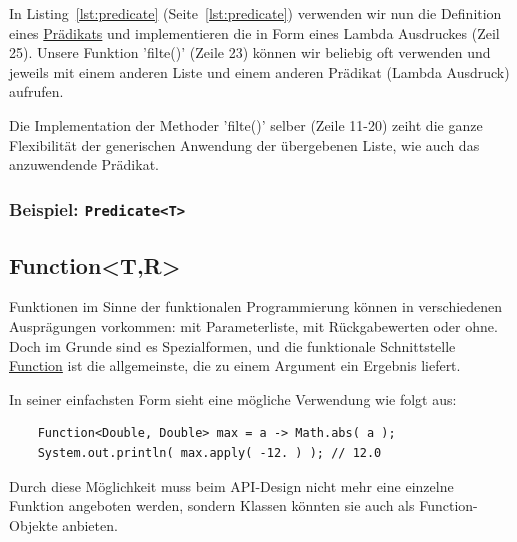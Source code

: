 In Listing~\ref{lst:predicate} (Seite~\ref{lst:predicate}) verwenden wir nun
die Definition eines
\href{https://docs.oracle.com/en/java/javase/11/docs/api/java.base/java/util/function/Predicate.html}
{Prädikats} und implementieren die in Form eines Lambda Ausdruckes (Zeil 25). Unsere Funktion
'filte()' (Zeile 23) können wir beliebig oft verwenden und jeweils mit einem anderen Liste und einem
anderen Prädikat (Lambda Ausdruck) aufrufen.

Die Implementation der Methoder 'filte()' selber (Zeile 11-20) zeiht die ganze Flexibilität
der generischen Anwendung der übergebenen Liste, wie auch das anzuwendende Prädikat.


\begin{frame}[fragile]
    \frametitle<presentation>{Beispiel: \texttt{Predicate<T>}}

\end{frame}

\mode*
{}


\subsection{Function<T,R>}
\label{subsec:function}

Funktionen im Sinne der funktionalen Programmierung können in verschiedenen
Ausprägungen vorkommen: mit Parameterliste, mit Rückgabewerten oder ohne.
Doch im Grunde sind es Spezialformen, und die funktionale Schnittstelle
\href{https://docs.oracle.com/en/java/javase/11/docs/api/java.base/java/util/function/Function.html}
{Function} ist die allgemeinste, die zu einem Argument
ein Ergebnis liefert.

In seiner einfachsten Form sieht eine mögliche Verwendung wie folgt aus:

\begin{verbatim}
    Function<Double, Double> max = a -> Math.abs( a );
    System.out.println( max.apply( -12. ) ); // 12.0
\end{verbatim}

Durch diese Möglichkeit muss beim API-Design nicht mehr eine einzelne Funktion
angeboten werden, sondern Klassen könnten sie auch als Function-Objekte anbieten.

